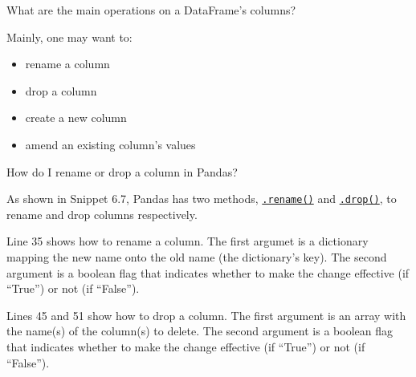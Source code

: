 \documentclass[a4paper,11pt]{book}
\numberwithin{figure}{chapter}
\numberwithin{table}{chapter}
\newcommand{\question}[1]{%
    \begin{tcolorbox}[colback=comp_c!10,colframe=comp_c,sidebyside align=top,width=\linewidth,before skip=1ex]
        #1
    \end{tcolorbox}
    \switchcolumn%
}
\newcommand{\note}[1]{%
    \begin{tcolorbox}[colback=white!0,colframe=white!10,width=\linewidth,before skip=1ex]
        #1
    \end{tcolorbox}
}
\begin{document}
\begin{paracol}{2}
	\question{\raggedright What are the main operations on a DataFrame's columns?}
	\note{Mainly, one may want to:
	\begin{itemize}
		\item rename a column
		\item drop a column
		\item create a new column
		\item amend an existing column's values
	\end{itemize}
	}
\end{paracol}

\begin{paracol}{2}
	\question{\raggedright How do I rename or drop a column in Pandas?}
	\note{As shown in Snippet 6.7, Pandas has two methods, \href{https://pandas.pydata.org/docs/reference/api/pandas.DataFrame.rename.html?highlight=rename#pandas.DataFrame.rename}{\texttt{.rename()}} and \href{https://pandas.pydata.org/docs/reference/api/pandas.DataFrame.drop.html?highlight=drop#pandas.DataFrame.drop}{\texttt{.drop()}}, to rename and drop columns respectively.

	\quad Line 35 shows how to rename a column. The first argumet is a dictionary mapping the new name onto the old name (the dictionary's key). The second argument is a boolean flag that indicates whether to make the change effective (if ``True'') or not (if ``False'').

	\quad Lines 45 and 51 show how to drop a column. The first argument is an array with the name(s) of the column(s) to delete. The second argument is a boolean flag that indicates whether to make the change effective (if ``True'') or not (if ``False'').
	}	
\end{paracol}
\clearpage
\end{document}
